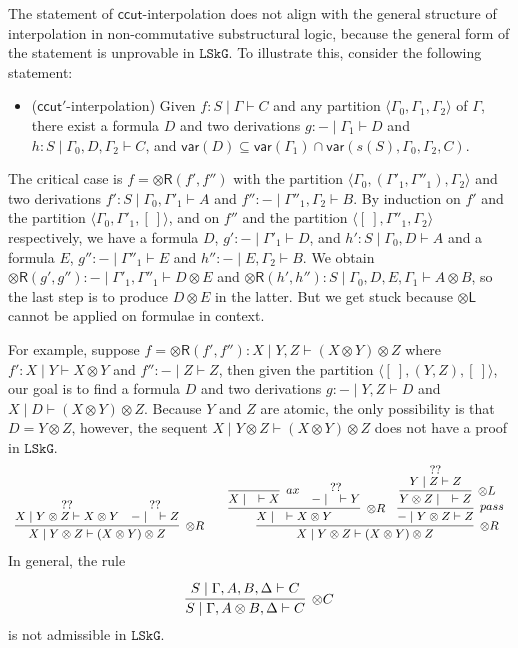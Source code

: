 \documentclass[a4paper,UKenglish,cleveref, autoref, thm-restate, anonymous]{lipics-v2021}
\newcommand{\GG}{\Gamma}
\newcommand{\GD}{\Delta}
\newcommand{\tl}{\otimes \mathsf{L}}
\newcommand{\tr}{\otimes\mathsf{R}}
\newcommand{\pass}{\mathsf{pass}}
\newcommand{\ax}{\mathsf{ax}}
\newcommand{\ot}{\otimes}
\newcommand{\vdG}{\vdash}
\newcommand{\LSkG}{$\mathtt{LSkG}$}
\newcommand{\mf}[1]{\mathsf{#1}}
\newcommand{\vars}[1]{\mathsf{var}(#1)}
\begin{document}
The statement of $\mf{ccut}$-interpolation does not align with the general structure of interpolation in non-commutative substructural logic, because the general form of the statement is unprovable in \LSkG.
To illustrate this, consider the following statement:
\begin{itemize}
  \item[\ ] ($\mf{ccut'}$-interpolation) Given $f: S \mid \Gamma \vdG C$ and any partition $\langle \GG_0,\GG_1, \GG_2 \rangle$ of $\GG$, there exist a formula $D$ and two derivations  $g : {-} \mid \GG_1 \vdG D$ and $h : S \mid \GG_0, D, \GG_2 \vdG C$, and $\vars{D} \subseteq \vars{\GG_1} \cap \vars{s(S), \GG_0, \GG_2, C}$.
\end{itemize}
The critical case is $f = \tr (f',f'')$ with the partition $\langle \GG_0, (\GG'_1, \GG''_1), \GG_2\rangle$ and two derivations $f' : S \mid \GG_0 , \GG'_1 \vdG A$ and $f'' : {-} \mid \GG''_1 , \GG_2 \vdG B$.
By induction on $f'$ and the partition $\langle \GG_0 , \GG'_1, [\ ] \rangle$, and on $f''$ and the partition $\langle [\ ], \GG''_1, \GG_2\rangle$ respectively, we have a formula $D$, $g' : {-} \mid \GG'_1 \vdG D$, and $h': S \mid \GG_0 , D \vdG A$ and a formula $E$, $g'' : {-} \mid \GG''_1 \vdG E$ and $h'': {-} \mid E, \GG_2 \vdG B$.
We obtain $\tr (g',g'') : {-} \mid \GG'_1, \GG''_1 \vdG D \ot E$ and $\tr (h', h'') : S \mid \GG_0, D, E, \GG_1 \vdG A \ot B$, so the last step is to produce $D \ot E$ in the latter.
But we get stuck because $\tl$ cannot be applied on formulae in context.

For example, suppose $f = \tr (f',f''): X \mid Y, Z \vdG (X\ot Y)\ot Z$ where $f':X \mid Y \vdG X\ot Y$ and $f'': {-} \mid Z \vdG Z$, then given the partition $\langle [\ ], (Y,Z), [\ ]\rangle$, our goal is to find a formula $D$ and two derivations $g: {-} \mid Y, Z \vdG D$ and $X \mid D \vdG (X\ot Y)\ot Z$.
Because $Y$ and $Z$ are atomic, the only possibility is that $D = Y \ot Z$, however, the sequent $X \mid Y \ot Z \vdG (X \ot Y) \ot Z$ does not have a proof in \LSkG.
\begin{equation*}\label{example:ccut:failure}
  \small\begin{array}{c}
    \infer[\tr]{X \mid Y \ot Z \vdG (X \ot Y) \ot Z}{
    \deduce{X \mid Y\ot Z \vdG X \ot Y}{??}
    &
    \deduce{{-} \mid \quad \vdG Z}{??}
  }
  \qquad
  \infer[\tr]{X \mid Y \ot Z \vdG (X \ot Y) \ot Z}{
    \infer[\tr]{X \mid \quad \vdG X \ot Y}{
      \infer[\ax]{X \mid \quad \vdG X}{}
      &
      \deduce{{-} \mid \quad \vdG Y}{??}
    }
    &
    \infer[\pass]{{-} \mid Y \ot Z \vdG Z}{
      \infer[\tl]{Y \ot Z \mid \quad \vdG Z}{
        \deduce{Y \mid Z \vdG Z}{??}
      }
    }
  }
  \end{array}
\end{equation*}
In general, the rule
\begin{displaymath}
  \infer[\ot\mf{C}]{S \mid \GG , A \ot B , \GD \vdG C}{
    \deduce{S \mid \GG, A , B , \GD \vdG C}{}
  }
\end{displaymath}
is not admissible in \LSkG.
\end{document}
